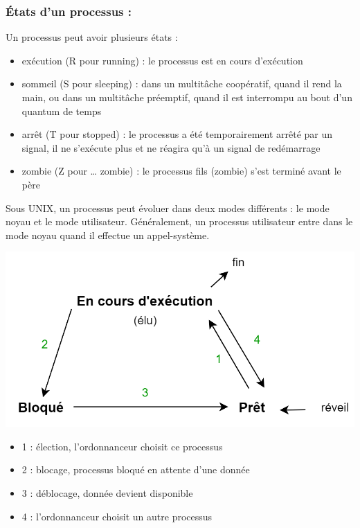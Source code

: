 		\subsubsection*{États d'un processus :}
			Un processus peut avoir plusieurs états :
			\begin{itemize}
				\item exécution (R pour running) : le processus est en cours d'exécution
				\item sommeil (S pour sleeping) : dans un multitâche coopératif, quand il rend la main, ou dans un multitâche préemptif, quand il est interrompu au bout d'un quantum de temps
				\item arrêt (T pour stopped) : le processus a été temporairement arrêté par un signal, il ne s'exécute plus et ne réagira qu'à un signal de redémarrage
				\item zombie (Z pour … zombie) : le processus fils (zombie) s'est terminé avant le père
			\end{itemize}
			Sous UNIX, un processus peut évoluer dans deux modes différents : le mode noyau et le mode utilisateur. Généralement, un processus utilisateur entre dans le mode noyau quand il effectue un appel-système.
			
			\begin{center}\includegraphics[scale=0.4]{../img/process.png}\end{center}
			
			\begin{itemize}
				\item 1 : élection, l'ordonnanceur choisit ce processus
				\item 2 : blocage, processus bloqué en attente d'une donnée
				\item 3 : déblocage, donnée devient disponible
				\item 4 : l'ordonnanceur choisit un autre processus
			\end{itemize}
			

